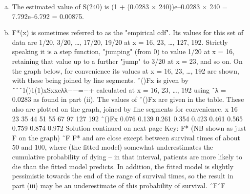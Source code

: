 \documentclass[a4paper,12pt]{article}
\begin{document}
\begin{enumerate}[(a)]
\item The estimated value of S(240) is (1 + (0.0283 × 240))e–0.0283 × 240 = 7.792e–6.792 = 0.00875.
\item F*(x) is sometimes referred to as the "empirical cdf". Its values for this set of data are 1/20, 3/20, …, 17/20, 19/20 at x = 16, 23, …, 127, 192. Strictly speaking it is a step function, "jumping" (from 0) to value 1/20 at x = 16, retaining that value up to a further "jump" to 3/20 at x = 23, and so on. On the graph below, for convenience its values at x = 16, 23, …, 192 are shown, with these being joined by line segments.
ˆ()Fx is given by ˆˆˆ1()1(1)xSxxeλλ−−=−+ calculated at x = 16, 23, …, 192 using ˆλ = 0.0283 as found in part (ii). The values of ˆ()Fx are given in the table. These also are plotted on the graph, joined by line segments for convenience.
x
16
23
35
44
51
55
67
97
127
192
ˆ()Fx
0.076
0.139
0.261
0.354
0.423
0.461
0.565
0.759
0.874
0.972
Solution continued on next page
Key:
F*
(NB shown as just F on the graph) ˆF
F* and are close except between survival times of about 50 and 100, where (the fitted model) somewhat underestimates the cumulative probability of dying – in that interval, patients are more likely to die than the fitted model predicts. In addition, the fitted model is slightly pessimistic towards the end of the range of survival times, so the result in part (iii) may be an underestimate of this probability of survival. ˆFˆF
 \end{enumerate}
 
\end{document}
